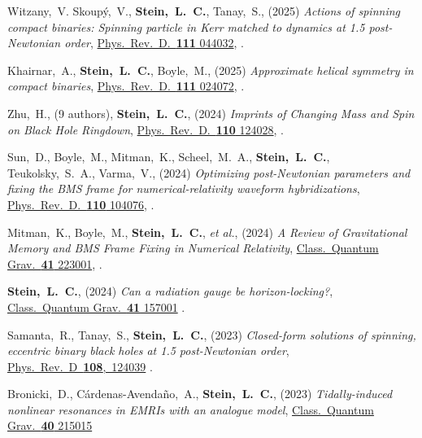 \begin{etaremune}[start=\value{pubCounter}]
\item
  Witzany,~V.
  Skoupý,~V.,
  {\bf Stein,~L.~C.},
  Tanay,~S.,
  (2025)
  {\it Actions of spinning compact binaries: Spinning particle in Kerr matched to dynamics at 1.5 post-Newtonian order},
  \href{https://doi.org/10.1103/PhysRevD.111.044032}%
  {Phys.~Rev.~D.~{\bf 111} 044032},
  .
\item
  Khairnar,~A.,
  {\bf Stein,~L.~C.},
  Boyle,~M.,
  (2025)
  {\it Approximate helical symmetry in compact binaries},
  \href{https://doi.org/10.1103/PhysRevD.111.024072}%
  {Phys.~Rev.~D.~{\bf 111} 024072},
  .
\item
  Zhu,~H.,
  (9 authors),
  {\bf Stein,~L.~C.},
  (2024)
  {\it Imprints of Changing Mass and Spin on Black Hole Ringdown},
  \href{https://doi.org/10.1103/PhysRevD.110.124028}%
  {Phys.~Rev.~D.~{\bf 110} 124028},
  .
\item
  Sun,~D.,
  Boyle,~M.,
  Mitman,~K.,
  Scheel,~M.~A.,
  {\bf Stein,~L.~C.},
  Teukolsky,~S.~A.,
  Varma,~V.,
  (2024)
  {\it Optimizing post-Newtonian parameters and fixing the BMS frame for numerical-relativity waveform hybridizations},
  \href{https://doi.org/10.1103/PhysRevD.110.104076}%
  {Phys.~Rev.~D.~{\bf 110} 104076},
  .
\item
  Mitman,~K.,
  Boyle,~M.,
  {\bf Stein,~L.~C.},
  {\it et al.},
  (2024)
  {\it A Review of Gravitational Memory and BMS Frame Fixing in Numerical Relativity},
  \href{https://doi.org/10.1088/1361-6382/ad83c2}%
  {Class.~Quantum Grav.~{\bf 41} 223001},
  .
\item
  {\bf Stein,~L.~C.},
  (2024)
  {\it Can a radiation gauge be horizon-locking?},
  \href{https://doi.org/10.1088/1361-6382/ad563b}%
  {Class.~Quantum Grav.~{\bf 41} 157001}
  .
\item
  Samanta,~R.,
  Tanay,~S.,
  {\bf Stein,~L.~C.},
  (2023)
  {\it Closed-form solutions of spinning, eccentric binary black holes at 1.5 post-Newtonian order},
  \href{https://doi.org/10.1103/PhysRevD.108.124039}%
  {Phys.~Rev.~D~{\bf 108},~124039}
  .
\item
  Bronicki,~D.,
  Cárdenas-Avendaño,~A.,
  {\bf Stein,~L.~C.},
  (2023)
  {\it Tidally-induced nonlinear resonances in EMRIs with an analogue model},
  \href{https://doi.org/10.1088/1361-6382/acfcfe}%
  {Class.~Quantum Grav.~{\bf 40} 215015}

\end{etaremune}
